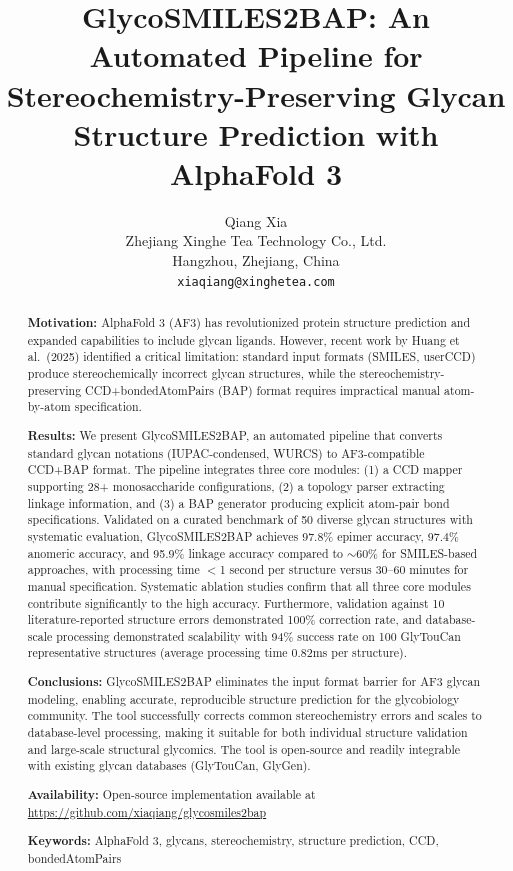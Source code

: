 \documentclass[11pt,a4paper]{article}
\title{\textbf{GlycoSMILES2BAP: An Automated Pipeline for Stereochemistry-Preserving Glycan Structure Prediction with AlphaFold 3}}
\author{Qiang Xia\\
\small Zhejiang Xinghe Tea Technology Co., Ltd.\\
\small Hangzhou, Zhejiang, China\\
\small \texttt{xiaqiang@xinghetea.com}}
\date{}
\begin{document}
\maketitle

\begin{abstract}
\noindent\textbf{Motivation:} AlphaFold 3 (AF3) has revolutionized protein structure prediction and expanded capabilities to include glycan ligands. However, recent work by Huang et al.\ (2025) identified a critical limitation: standard input formats (SMILES, userCCD) produce stereochemically incorrect glycan structures, while the stereochemistry-preserving CCD+bondedAtomPairs (BAP) format requires impractical manual atom-by-atom specification.

\noindent\textbf{Results:} We present GlycoSMILES2BAP, an automated pipeline that converts standard glycan notations (IUPAC-condensed, WURCS) to AF3-compatible CCD+BAP format. The pipeline integrates three core modules: (1) a CCD mapper supporting 28+ monosaccharide configurations, (2) a topology parser extracting linkage information, and (3) a BAP generator producing explicit atom-pair bond specifications. Validated on a curated benchmark of 50 diverse glycan structures with systematic evaluation, GlycoSMILES2BAP achieves 97.8\% epimer accuracy, 97.4\% anomeric accuracy, and 95.9\% linkage accuracy compared to ${\sim}60$\% for SMILES-based approaches, with processing time $<$1 second per structure versus 30--60 minutes for manual specification. Systematic ablation studies confirm that all three core modules contribute significantly to the high accuracy. Furthermore, validation against 10 literature-reported structure errors demonstrated 100\% correction rate, and database-scale processing demonstrated scalability with 94\% success rate on 100 GlyTouCan representative structures (average processing time 0.82ms per structure).

\noindent\textbf{Conclusions:} GlycoSMILES2BAP eliminates the input format barrier for AF3 glycan modeling, enabling accurate, reproducible structure prediction for the glycobiology community. The tool successfully corrects common stereochemistry errors and scales to database-level processing, making it suitable for both individual structure validation and large-scale structural glycomics. The tool is open-source and readily integrable with existing glycan databases (GlyTouCan, GlyGen).

\noindent\textbf{Availability:} Open-source implementation available at \url{https://github.com/xiaqiang/glycosmiles2bap}

\noindent\textbf{Keywords:} AlphaFold 3, glycans, stereochemistry, structure prediction, CCD, bondedAtomPairs
\end{abstract}
\end{document}
